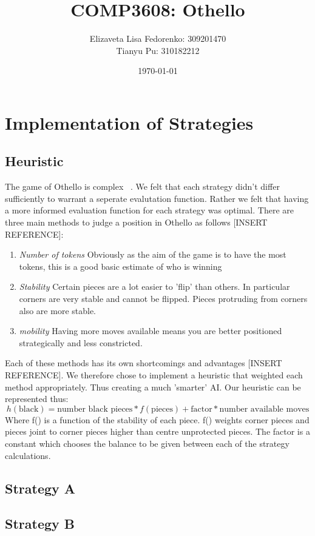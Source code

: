 \documentclass[12pt]{article}
\title{COMP3608: Othello}
\author{Elizaveta Lisa Fedorenko: 309201470
\\ Tianyu Pu: 310182212}
\date{\today}
\begin{document}
\maketitle

\section{Implementation of Strategies}
\subsection{Heuristic}
The game of Othello is complex ~\cite{post}. We felt that each strategy didn't differ sufficiently to warrant a seperate evalutation function. Rather we felt that having a more informed evaluation function for each strategy was optimal. There are three main methods to judge a position in Othello as follows [INSERT REFERENCE]:
\begin{enumerate}
\item \emph{Number of tokens} Obviously as the aim of the game is to have the most tokens, this is a good basic estimate of who is winning
\item \emph{Stability} Certain pieces are a lot easier to 'flip' than others. In particular corners are very stable and cannot be flipped. Pieces protruding from corners also are more stable.
\item \emph{mobility} Having more moves available means you are better positioned strategically and less constricted.
\end{enumerate}
Each of these methods has its own shortcomings and advantages [INSERT REFERENCE]. We therefore chose to implement a heuristic that weighted each method appropriately. Thus creating a much 'smarter' AI.
Our heuristic can be represented thus:
\begin{equation}
h(\mbox{black}) = \mbox{number black pieces}*f(\mbox{pieces}) + \mbox{factor}*\mbox{number available moves}
\end{equation}
Where f() is a function of the stability of each piece. f() weights corner pieces and pieces joint to corner pieces higher than centre unprotected pieces. The factor is a constant which chooses the balance to be given between each of the strategy calculations.
\subsection{Strategy A}
\subsection{Strategy B}
\end{document}
